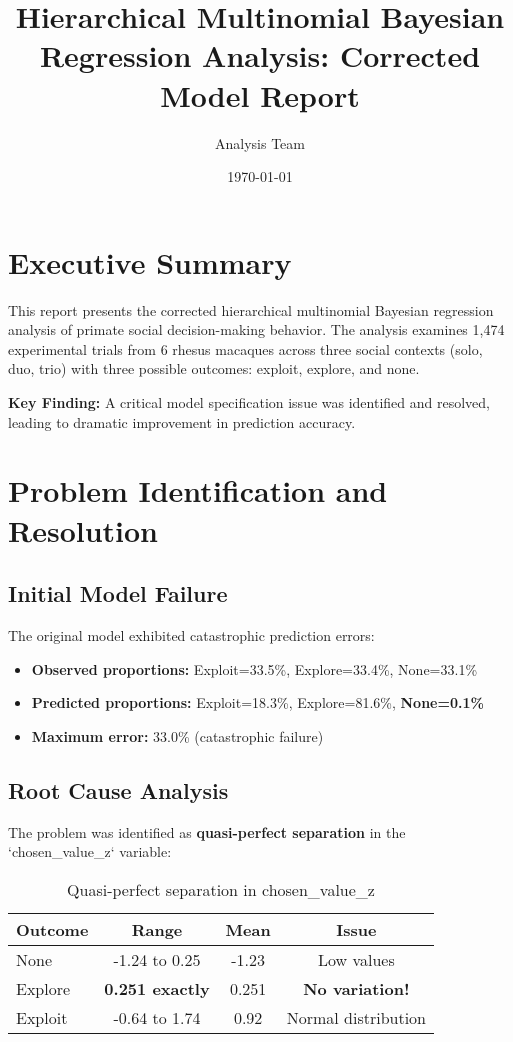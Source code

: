 \documentclass[11pt]{article}
\title{\textbf{Hierarchical Multinomial Bayesian Regression Analysis: Corrected Model Report}}
\author{Analysis Team}
\date{\today}
\begin{document}
\maketitle

\section{Executive Summary}

This report presents the corrected hierarchical multinomial Bayesian regression analysis of primate social decision-making behavior. The analysis examines 1,474 experimental trials from 6 rhesus macaques across three social contexts (solo, duo, trio) with three possible outcomes: exploit, explore, and none.

\textbf{Key Finding:} A critical model specification issue was identified and resolved, leading to dramatic improvement in prediction accuracy.

\section{Problem Identification and Resolution}

\subsection{Initial Model Failure}

The original model exhibited catastrophic prediction errors:
\begin{itemize}
    \item \textbf{Observed proportions:} Exploit=33.5\%, Explore=33.4\%, None=33.1\%
    \item \textbf{Predicted proportions:} Exploit=18.3\%, Explore=81.6\%, \textbf{None=0.1\%}
    \item \textbf{Maximum error:} 33.0\% (catastrophic failure)
\end{itemize}

\subsection{Root Cause Analysis}

The problem was identified as \textbf{quasi-perfect separation} in the `chosen\_value\_z` variable:

\begin{table}[h]
\centering
\begin{tabular}{lccc}
\toprule
\textbf{Outcome} & \textbf{Range} & \textbf{Mean} & \textbf{Issue} \\
\midrule
None & -1.24 to 0.25 & -1.23 & Low values \\
Explore & \textbf{0.251 exactly} & 0.251 & \textbf{No variation!} \\
Exploit & -0.64 to 1.74 & 0.92 & Normal distribution \\
\bottomrule
\end{tabular}
\caption{Quasi-perfect separation in chosen\_value\_z}
\end{table}
\end{document}
